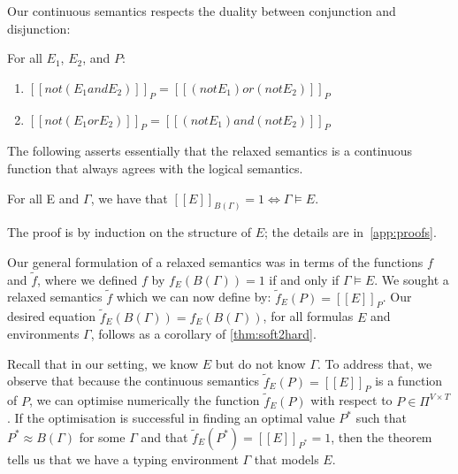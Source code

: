 \documentclass[acmsmall, review, anonymous]{acmart}\settopmatter{printfolios=true,printccs=false,printacmref=false}
\newcommand{\qqpi}[2]{[\![#2]\!]_{#1}}
\begin{document}
Our continuous semantics respects the duality between conjunction and disjunction:
\begin{lemma}[Duality]
For all $E_1$, $E_2$, and $P$:
\begin{enumerate}
    \item $\qqpi{P}{\mathrel{not}(E_1 \mathrel{and} E_2)} = \qqpi{P}{(\mathrel{not} E_1) \mathrel{or} (\mathrel{not} E_2)}$
    \item $\qqpi{P}{\mathrel{not}(E_1 \mathrel{or} E_2)} = \qqpi{P}{(\mathrel{not} E_1) \mathrel{and} (\mathrel{not} E_2)}$
\end{enumerate}
\end{lemma}
\iffalse
\begin{verbatim}
    not(E1 and E2) = (not E1) or (not E2)

[LHS]P = 1 - ([E1]P * [E2]P)
[RHS]P = (1-[E1]P) or (1-[E2]P)
 = (1-[E1]P) + (1-[E2]P) - ((1-[E1]P) * (1-[E2]P))
 = (1-[E1]P) + (1-[E2]P) - (1 -[E1]P -[E2]P + ([E1]P * [E2]P))
 = (1-[E1]P) + (1-[E2]P) -  1 + [E1]P + [E2]P - ([E1]P * [E2]P))
 = 1 - ([E1]P * [E2]P)
\end{verbatim}
\begin{verbatim}
    not(E1 or E2) = (not E1) and (not E2)

[LHS]P = 1 - ([E1]P + [E2]P - ([E1]P * [E2]P))
 = 1 - [E1]P - [E2]P + ([E1]P * [E2]P)
[RHS]P = (1-[E1]P) * (1-[E2]P)
 = 1 -[E1]P - [E2]P + ([E1]P * [E2]P)
\end{verbatim}
\fi %

The following asserts essentially that the relaxed semantics is a continuous function that always agrees with the logical semantics.
\begin{theorem}[Relaxation]\label{thm:soft2hard}
For all E and $\Gamma$, we have that $\qqpi{B(\Gamma)}{E} = 1 \Leftrightarrow \Gamma \models E$.
\end{theorem}
The proof is by induction on the structure of $E$;
the details are in~\cref{app:proofs}.

Our general formulation of a relaxed semantics was in terms of the functions $f$ and $\tilde{f}$,
where we defined $f$ by $f_{E}(B(\Gamma)) = 1$ if and only if $\Gamma \models E$.
We sought a relaxed semantics $\tilde{f}$ which we can now define by: $\tilde{f}_E(P) = \qqpi{P}{E}$.
%
Our desired equation $\tilde{f}_{E}(B(\Gamma)) = f_E(B(\Gamma))$,
for all formulas $E$ and environments $\Gamma$,
follows as a corollary of \cref{thm:soft2hard}.

Recall that in our setting, we know $E$ but
do not know $\Gamma$.
To address that, we observe that because the continuous semantics $\tilde{f}_E(P) = \qqpi{P}{E}$ is a function of $P$, we can optimise numerically
the function $\tilde{f}_E(P)$ with respect to $P \in \Pi^{V \times T}$.
If the optimisation is successful in finding an optimal value $P^*$ such that
$P^* \approx B(\Gamma)$ for some $\Gamma$ and that $\tilde{f}_E(P^*) = \qqpi{P^*}{E} = 1$,
then the theorem tells us that we have a typing environment $\Gamma$ that models $E$.
\end{document}
